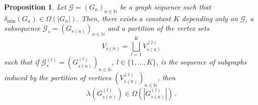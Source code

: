 \documentclass[a4paper,onecolumn,accepted=2024-12-14]{quantumarticle}
\newtheorem{proposition}[theorem]{Proposition}
\theoremstyle{plain}
\newcommand{\cG}{{\mathcal G}}         %
\newcommand{\N}{\mathbb{N}} %
\begin{document}
\begin{proposition}\label{propdegAGME}
Let $\cG=(G_n)_{n\in\N}$ be a graph sequence such that
$\delta_{\mathrm{min}}(G_n)\in\Omega(|G_n|)$.
Then, there exists a constant $K$ depending only on $\cG$, a subsequence $\cG_s=(G_{s(n)})_{n\in\N}$ and a partition of the vertex sets
\begin{equation}
V_{s(n)}=\bigsqcup_{l=1}^{K}V_{s(n)}^{(l)}
\end{equation}
such that if
$\cG_s^{(l)}=\left(G^{(l)}_{s(n)}\right)_{n\in\N}$,
$l\in\{1,\dots, K\}$, is the sequence of subgraphs induced by the partition of vertices
$\left(V_{s(n)}^{(l)}\right)_{n\in\N}$, then
\begin{equation}
\lambda\left(G_{s(n)}^{(l)}\right)\in\Omega\left(|G_{s(n)}^{(l)}|\right)\,.
\end{equation}
\end{proposition}
\end{document}

